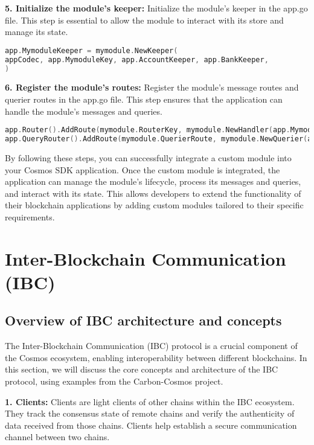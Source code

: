 \documentclass{article}
\begin{document}
\textbf{5. Initialize the module's keeper:} Initialize the module's keeper in the app.go file. This step is essential to allow the module to interact with its store and manage its state.

\begin{lstlisting}[language=Go]
app.MymoduleKeeper = mymodule.NewKeeper(
appCodec, app.MymoduleKey, app.AccountKeeper, app.BankKeeper,
)
\end{lstlisting}

\textbf{6. Register the module's routes:} Register the module's message routes and querier routes in the app.go file. This step ensures that the application can handle the module's messages and queries.

\begin{lstlisting}[language=Go]
app.Router().AddRoute(mymodule.RouterKey, mymodule.NewHandler(app.MymoduleKeeper))
app.QueryRouter().AddRoute(mymodule.QuerierRoute, mymodule.NewQuerier(app.MymoduleKeeper))
\end{lstlisting}

By following these steps, you can successfully integrate a custom module into your Cosmos SDK application. Once the custom module is integrated, the application can manage the module's lifecycle, process its messages and queries, and interact with its state. This allows developers to extend the functionality of their blockchain applications by adding custom modules tailored to their specific requirements.

\section{Inter-Blockchain Communication (IBC)}

\subsection{Overview of IBC architecture and concepts}

The Inter-Blockchain Communication (IBC) protocol is a crucial component of the Cosmos ecosystem, enabling interoperability between different blockchains. In this section, we will discuss the core concepts and architecture of the IBC protocol, using examples from the Carbon-Cosmos project.

\textbf{1. Clients:} Clients are light clients of other chains within the IBC ecosystem. They track the consensus state of remote chains and verify the authenticity of data received from those chains. Clients help establish a secure communication channel between two chains.
\end{document}
